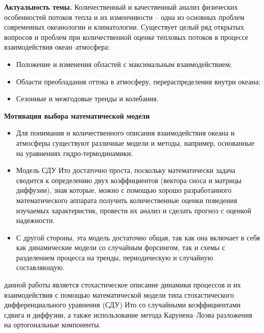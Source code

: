 {\actuality} 
\textbf{Актуальность темы.}
Количественный и качественный анализ физических особенностей потоков тепла и их изменчивости --  одна из основных проблем современных океанологии и климатологии. Существует целый ряд открытых вопросов и проблем при количественной оценке тепловых потоков в процессе взаимодействия океан--атмосфера:
\begin{itemize}
	\item Положение и изменения областей с максимальным взаимодействием;
	\item Области преобладания оттока в атмосферу, перераспределения внутри океана;
	\item Сезонные и межгодовые тренды и колебания. 
\end{itemize}

\noindent
\textbf{Мотивация выбора математической модели}
\begin{itemize}
	\item Для понимания и количественного описания взаимодействия океана и атмосферы существуют различные модели и методы, например, основанные на уравнениях гидро-термодинамики. 
	\item Модель СДУ Ито достаточно проста, поскольку математически задача сводится к определению двух коэффициентов (вектора сноса и матрицы диффузии), зная которые, можно с помощью хорошо разработанного математического аппарата получить количественные оценки поведения изучаемых характеристик, провести их анализ и сделать прогноз с оценкой надежности.
	\item С другой стороны, эта модель достаточно общая, так как она включает в себя как динамические модели со случайным форсингом, так и схемы с разделением процесса на тренды, периодическую и случайную составляющую.
\end{itemize}




{\aim} данной работы является стохастическое описание динамики процессов и их взаимодействия с помощью математической модели типа стохастического дифференциального уравнения (СДУ) Ито со случайными коэффициентами сдвига и диффузии, а также использование метода Карунена--Лоэва разложения на ортогональные компоненты.

